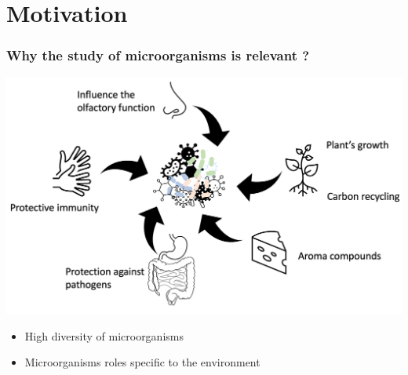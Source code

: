 \documentclass[8pt]{beamer}
\begin{document}
\section{Motivation}

\begin{frame}
\frametitle{Why the study of microorganisms is relevant ?}
\centering
\includegraphics[width=\textwidth]{figures/bacterial-env.pdf}

\begin{block}{}
\begin{itemize}
\item High diversity of microorganisms
\item Microorganisms roles specific to the environment \tiny\citep{10.1093/chemse/bjh067,BELKAID2014121,Zhang2015,Hoorman2011,McSweeney2000}
\end{itemize}
\end{block}
\end{frame}
\end{document}
